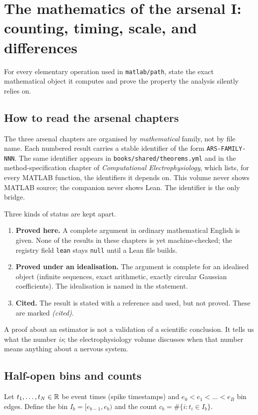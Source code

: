 \chapter[Arsenal I: counting and timing]{The mathematics of the arsenal I: counting, timing, scale, and differences}\label{ch:arsenal-counting}
\begin{readergoal}For every elementary operation used in \texttt{matlab/path}, state the exact mathematical object it computes and prove the property the analysis silently relies on.\end{readergoal}

\section*{How to read the arsenal chapters}
The three arsenal chapters are organised by \emph{mathematical} family, not by file name. Each numbered result carries a stable identifier of the form \texttt{ARS-FAMILY-NNN}. The same identifier appears in \texttt{books/shared/theorems.yml} and in the method-specification chapter of \emph{Computational Electrophysiology}, which lists, for every MATLAB function, the identifiers it depends on. This volume never shows MATLAB source; the companion never shows Lean. The identifier is the only bridge.

Three kinds of status are kept apart.
\begin{enumerate}[leftmargin=2em]
\item \textbf{Proved here.} A complete argument in ordinary mathematical English is given. None of the results in these chapters is yet machine-checked; the registry field \texttt{lean} stays \texttt{null} until a Lean file builds.
\item \textbf{Proved under an idealisation.} The argument is complete for an idealised object (infinite sequences, exact arithmetic, exactly circular Gaussian coefficients). The idealisation is named in the statement.
\item \textbf{Cited.} The result is stated with a reference and used, but not proved. These are marked \emph{(cited)}.
\end{enumerate}
A proof about an estimator is not a validation of a scientific conclusion. It tells us what the number \emph{is}; the electrophysiology volume discusses when that number means anything about a nervous system.

\section{Half-open bins and counts}
Let $t_1,\dots,t_N\in\mathbb R$ be event times (spike timestamps) and $e_0<e_1<\dots<e_B$ bin edges. Define the bin $I_b=[e_{b-1},e_b)$ and the count $c_b=\#\{i: t_i\in I_b\}$.

